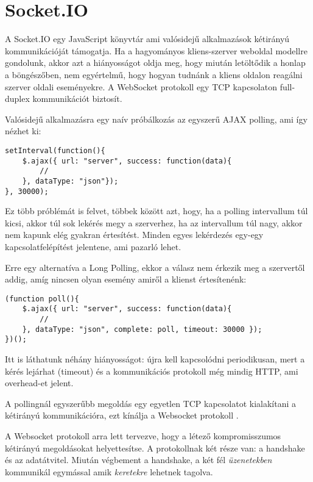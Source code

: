 \section{Socket.IO}
A Socket.IO egy JavaScript könyvtár ami valósidejű alkalmazások kétirányú kommunikációját támogatja. Ha a hagyományos kliens-szerver weboldal modellre gondolunk, akkor azt a hiányosságot oldja meg, hogy miután letöltődik a honlap a böngészőben, nem egyértelmű, hogy hogyan tudnánk a kliens oldalon reagálni szerver oldali eseményekre. A WebSocket protokoll egy TCP kapcsolaton full-duplex kommunikációt biztosít.

Valósidejű alkalmazásra egy naív próbálkozás az egyszerű AJAX polling, ami így nézhet ki:
\medskip
\begin{lstlisting}[caption=Egyszerű polling]
setInterval(function(){
    $.ajax({ url: "server", success: function(data){
        //
    }, dataType: "json"});
}, 30000);
\end{lstlisting}

Ez több próblémát is felvet, többek között azt, hogy, ha a polling intervallum túl kicsi, akkor túl sok lekérés megy a szerverhez, ha az intervallum túl nagy, akkor nem kapunk elég gyakran értesítést. Minden egyes lekérdezés egy-egy kapcsolatfelépítést jelentene, ami pazarló lehet.

Erre egy alternatíva a Long Polling, ekkor a válasz nem érkezik meg a szervertől addig, amíg nincsen olyan esemény amiről a klienst értesítenénk:

\begin{lstlisting}[caption=Long Polling]
(function poll(){
    $.ajax({ url: "server", success: function(data){
        // 
    }, dataType: "json", complete: poll, timeout: 30000 });
})();
\end{lstlisting}

Itt is láthatunk néhány hiányosságot: újra kell kapcsolódni periodikusan, mert a kérés lejárhat (timeout) és a kommunikációs protokoll még mindig HTTP, ami overhead-et jelent.


A pollingnál egyszerűbb megoldás egy egyetlen TCP kapcsolatot kialakítani a kétirányú kommunikációra, ezt kínálja a Websocket protokoll \cite{rfc6455}.

A Websocket protokoll arra lett tervezve, hogy a létező kompromisszumos kétirányú megoldásokat helyettesítse. A protokollnak két része van: a handshake és az adatátvitel. Miután végbement a handshake, a két fél \emph{üzenetekben} kommunikál egymással amik \emph{keretekre} lehetnek tagolva.

